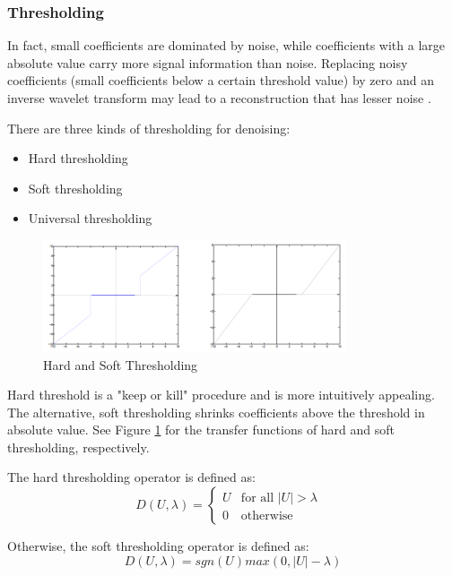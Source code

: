 \subsubsection*{Thresholding}
In fact, small coefficients are dominated by noise, while coefficients with a large absolute value carry more signal information than noise. Replacing noisy coefficients (small coefficients below a certain threshold value) by zero and an inverse wavelet transform may lead to a reconstruction that has lesser noise \cite{rangarajan2002image}. 

There are three kinds of thresholding for denoising:
\begin{itemize}
	\item Hard thresholding
	\item Soft thresholding
	\item Universal thresholding
\end{itemize}

\begin{figure}[h]
	\centering
	\includegraphics[width=0.8\textwidth]{fig/hard_soft_thresholding}
	\caption[PET Denoising - Hard and Soft Thresholding]{Hard and Soft Thresholding}
	\label{fig:hard_soft_thresholding}
\end{figure}

Hard threshold is a "keep or kill" procedure and
is more intuitively appealing. The alternative, soft
thresholding shrinks coefficients above the threshold in absolute value. See Figure \ref{fig:hard_soft_thresholding} for the transfer functions of hard and soft thresholding, respectively. 

The hard thresholding operator is defined as:
\begin{equation}
D(U, \lambda) = 
\begin{cases}
U &\text{for all $|U|>\lambda$ }\\
0 &\text{otherwise}
\end{cases}	
\end{equation}

Otherwise, the soft thresholding operator is defined as:
\begin{equation}
D(U, \lambda) = sgn(U)max(0, |U| - \lambda)
\end{equation}


